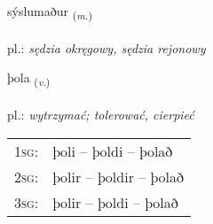 \documentclass[frontgrid, backgrid]{flacards}\usepackage[]{graphicx}\usepackage[]{xcolor}
\begin{document}
\renewcommand{\flhead}{\vskip5pt \fboxsep=0pt {\small\bfseries\footnotesize Nafnorð | Noun}}
\renewcommand{\fcfoot}{\vskip5pt \fboxsep=0pt \hspace{2pt}{\small\bfseries\footnotesize 2K}}

\renewcommand{\blhead}{\vskip5pt {\small\bfseries\footnotesize Nafnorð | Noun }}
\renewcommand{\bcfoot}{\vskip5pt \hspace{2pt}{\small\bfseries\footnotesize 2K}}


{sýslumaður \small{\textsubscript{(\textit{m.})}} \\[1ex] %
\textphonetic{[sistlʏmaðʏr]} \\
pl.: \emph{sędzia okręgowy, sędzia rejonowy} \\  [2ex]
\renewcommand*{\arraystretch}{0.8}
}

\renewcommand{\flhead}{\vskip5pt \fboxsep=0pt {\small\bfseries\footnotesize Sagnorð | Verb}}
\renewcommand{\fcfoot}{\vskip5pt \fboxsep=0pt \hspace{2pt}{\small\bfseries\footnotesize 2K}}

\renewcommand{\blhead}{\vskip5pt {\small\bfseries\footnotesize Sagnorð | Verb }}
\renewcommand{\bcfoot}{\vskip5pt \hspace{2pt}{\small\bfseries\footnotesize 2K}}


{þola \small{\textsubscript{(\textit{v.})}} \\[1ex] %
\textphonetic{[θɔːla]} \\
pl.: \emph{wytrzymać; tolerować, cierpieć} \\  [2ex]
\renewcommand*{\arraystretch}{0.8}
\begin{tabular}{p{1cm}l}
\textsc{1sg}: & þoli -- þoldi -- þolað \\ 
\textsc{2sg}: & þolir -- þoldir -- þolað \\ 
\textsc{3sg}: & þolir -- þoldi -- þolað \\ 
\end{tabular}
}
\end{document}
